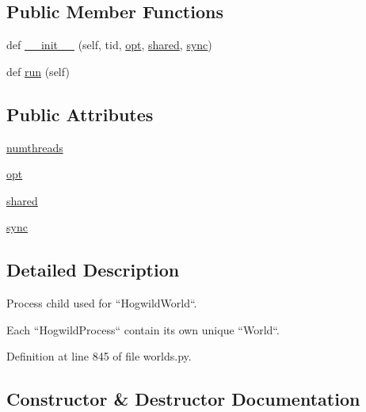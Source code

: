 \subsection*{Public Member Functions}
\begin{DoxyCompactItemize}
\item 
def \hyperlink{classparlai_1_1core_1_1worlds_1_1HogwildProcess_a8356a8de17d41e86e4da0262fc5d36d7}{\+\_\+\+\_\+init\+\_\+\+\_\+} (self, tid, \hyperlink{classparlai_1_1core_1_1worlds_1_1HogwildProcess_a640d8da3bcea07a0748b8973f390f125}{opt}, \hyperlink{classparlai_1_1core_1_1worlds_1_1HogwildProcess_a614b61613d85c80764b8b68697697e13}{shared}, \hyperlink{classparlai_1_1core_1_1worlds_1_1HogwildProcess_a7bf5f7806e93a6b1ecb02fd12fa4a01f}{sync})
\item 
def \hyperlink{classparlai_1_1core_1_1worlds_1_1HogwildProcess_a749caf3085cb7b373db66b6f92567290}{run} (self)
\end{DoxyCompactItemize}
\subsection*{Public Attributes}
\begin{DoxyCompactItemize}
\item 
\hyperlink{classparlai_1_1core_1_1worlds_1_1HogwildProcess_a4266e7c47686cd9b4fa9d62ae84375c8}{numthreads}
\item 
\hyperlink{classparlai_1_1core_1_1worlds_1_1HogwildProcess_a640d8da3bcea07a0748b8973f390f125}{opt}
\item 
\hyperlink{classparlai_1_1core_1_1worlds_1_1HogwildProcess_a614b61613d85c80764b8b68697697e13}{shared}
\item 
\hyperlink{classparlai_1_1core_1_1worlds_1_1HogwildProcess_a7bf5f7806e93a6b1ecb02fd12fa4a01f}{sync}
\end{DoxyCompactItemize}


\subsection{Detailed Description}
\begin{DoxyVerb}Process child used for ``HogwildWorld``.

Each ``HogwildProcess`` contain its own unique ``World``.
\end{DoxyVerb}
 

Definition at line 845 of file worlds.\+py.



\subsection{Constructor \& Destructor Documentation}
\mbox{\label{classparlai_1_1core_1_1worlds_1_1HogwildProcess_a8356a8de17d41e86e4da0262fc5d36d7}} 
